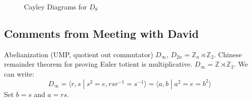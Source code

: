         \begin{figure}[H]
            \centering
            \captionsetup{type=figure}
            \begin{subfigure}[b]{0.49\textwidth}
                \resizebox{\textwidth}{!}{%
                    }
                \label{fig:Std_Cayley_Diagram_D8}
            \end{subfigure}
            \begin{subfigure}[b]{0.49\textwidth}
                \resizebox{\textwidth}{!}{%
                    }
                \label{fig:Alt_Cayley_Diagram_D8}
            \end{subfigure}
            \caption{Cayley Diagrams for $D_{8}$}
            \label{fig:Cayley_Diagrams_D8}
        \end{figure}
        \subsection{Comments from Meeting with David}
            Abelianization (UMP, quotient out commutator)
            $D_{\infty}$, $D_{2n}=\mathbb{Z}_{n}\rtimes\mathbb{Z}_{2}$. Chinese
            remainder theorem for proving Euler totient is multiplicative.
            $D_{\infty}=\mathbb{Z}\rtimes\mathbb{Z}_{2}$. We can write:
            \begin{equation}
                D_{\infty}=\langle{r,s}\;|\;
                    s^{2}=e,rsr^{\minus{1}}=s^{\minus{1}}\rangle
                =\langle{a,b}\;|\;a^{2}=e=b^{2}\rangle
            \end{equation}
            Set $b=s$ and $a=rs$.